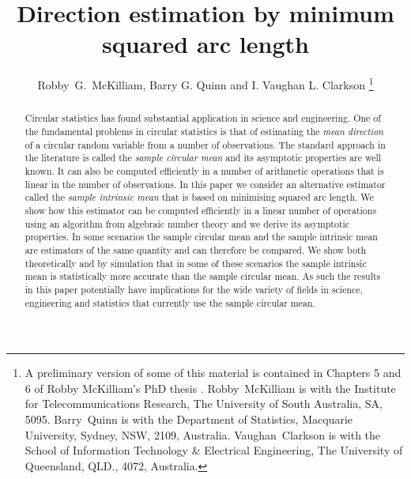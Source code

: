 \documentclass[journal]{IEEEtran}
\begin{document}
\title{Direction estimation by minimum squared arc length}

\author{Robby~G.~McKilliam, Barry G. Quinn and I. Vaughan L. Clarkson%
  \thanks{A preliminary version of some of this material is contained in Chapters 5 and 6 of Robby McKilliam's PhD thesis \cite{McKilliam2010thesis}. Robby~McKilliam is with the Institute for Telecommunications Research, The University of South Australia, SA, 5095.  Barry~Quinn is with the Department of Statistics, Macquarie University, Sydney, NSW, 2109, Australia.   Vaughan~Clarkson is with the School of Information Technology \& Electrical Engineering, The University of Queensland, QLD., 4072, Australia.}
     }

\maketitle

 
\begin{abstract}
Circular statistics has found substantial application in science and engineering. One of the fundamental problems in circular statistics is that of estimating the \emph{mean direction} of a circular random variable from a number of observations. %
The standard approach in the literature is called the \emph{sample circular mean} and its asymptotic properties are well known. It can also be computed efficiently in a number of arithmetic operations that is linear in the number of observations. In this paper we consider an alternative estimator called the \emph{sample intrinsic mean} that is based on minimising squared arc length. We show how this estimator can be computed efficiently in a linear number of operations using an algorithm from algebraic number theory and we derive its asymptotic properties. 
In some scenarios the sample circular mean and the sample intrinsic mean are estimators of the same quantity and can therefore be compared.  We show both theoretically and by simulation that in some of these scenarios the sample intrinsic mean is statistically more accurate than the sample circular mean. As such the results in this paper potentially have implications for the wide variety of fields in science, engineering and statistics that currently use the sample circular mean.
\end{abstract}
\end{document}
